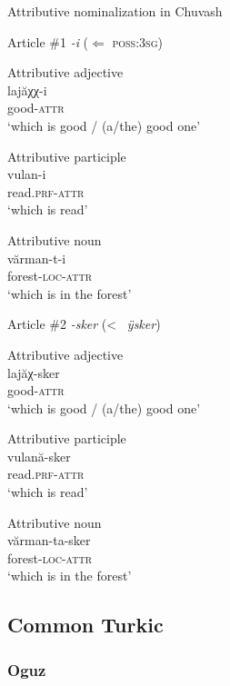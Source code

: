 \begin{exe}
\ex 
\rm{Attributive nominalization in Chuvash \citep{krueger1961}}\\
\begin{xlist}
\ex 
\rm{Article \#1 \textit{-i} ($\Leftarrow$ \textsc{poss:3sg})}
\begin{xlist}
\ex	
\rm{Attributive adjective}\\
\gll	lajăχχ-i\\
	good-\textsc{attr}\\
\glt	‘which is good / (a/the) good one’

\ex	
\rm{Attributive participle}\\
\gll	vulan-i\\
	read.\textsc{prf}-\textsc{attr}\\
\glt	‘which is read’

\ex	
\rm{Attributive noun}\\
\gll	vărman-t-i\\
	forest-\textsc{loc}-\textsc{attr}\\
\glt	‘which is in the forest’
\end{xlist}

\ex 
\rm{Article \#2 \textit{-sker} (<~ \textit{ÿsker})}
\begin{xlist}
\ex	
\rm{Attributive adjective}\\
\gll	lajăχ-sker\\
	good-\textsc{attr}\\
\glt	‘which is good / (a/the) good one’

\ex	
\rm{Attributive participle}\\
\gll	vulană-sker\\
	read.\textsc{prf}-\textsc{attr}\\
\glt	‘which is read’

\ex	
\rm{Attributive noun}\\
\gll	vărman-ta-sker\\
	forest-\textsc{loc}-\textsc{attr}\\
\glt	‘which is in the forest’
\end{xlist}
\end{xlist}
\end{exe}

\subsection{Common Turkic}
\subsubsection{Oguz}
